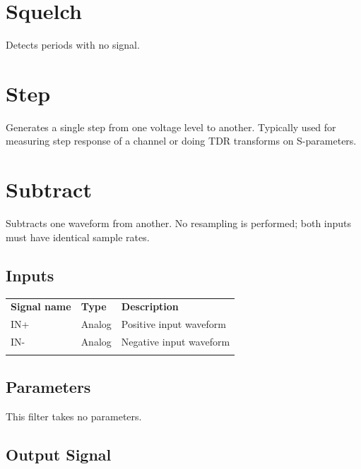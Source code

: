 \pagebreak
\section{Squelch}

Detects periods with no signal.

\pagebreak
\section{Step}

Generates a single step from one voltage level to another. Typically used for measuring step response of a channel or
doing TDR transforms on S-parameters.

\pagebreak
\section{Subtract}


Subtracts one waveform from another. No resampling is performed; both inputs must have identical sample rates.

\subsection{Inputs}

\begin{tabularx}{16cm}{llX}
\thickhline
\textbf{Signal name} & \textbf{Type} & \textbf{Description} \\
\thickhline
IN+ & Analog & Positive input waveform \\
\thickhline
IN- & Analog & Negative input waveform \\
\thickhline
\end{tabularx}

\subsection{Parameters}

This filter takes no parameters.

\subsection{Output Signal}

